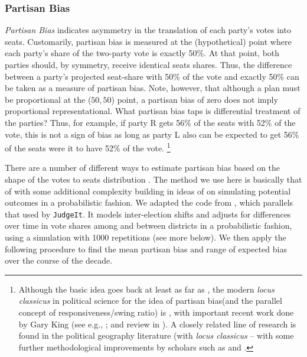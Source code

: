             \subsubsection*{Partisan Bias}
%
    \textit{Partisan Bias} indicates asymmetry in the translation of each party’s votes into seats. Customarily, partisan bias is measured at the (hypothetical) point where each party’s share of the two-party vote is exactly 50\%. At that point, both parties should, by symmetry, receive identical seats shares. Thus, the difference between a party’s projected seat-share with 50\% of the vote and exactly 50\% can be taken as a measure of partisan bias. Note, however, that although a plan must be proportional at the ($50,50$) point, a partisan bias of zero does not imply proportional representational. What partisan bias taps is differential treatment of the parties? Thus, for example, if party R gets 56\% of the seats with 52\% of the vote, this is not a sign of bias as long as party L also can be expected to get 56\% of the seats were it to have 52\% of the vote.
        \footnote{Although the basic idea goes back at least as far as \citet{Dahl1956}, the modern \textit{locus classicus} in political science for the idea of partisan bias(and the parallel concept of responsiveness/swing ratio) is \citet{Tufte1973}, with important recent work done by Gary King (see e.g., \citep{GelmanKing1994_unifiedAJPS}; and review in \citet{GrofmanKing2007_ELJ}). A closely related line of research is found in the political geography literature (with \textit{locus classicus} \citet{Brookes1959, Brookes1960} -- with some further methodological improvements by scholars such as \citet{Johnston1994, Rossiter1997} and \citet{Johnston2002}.}   
\par
    There are a number of different ways to estimate partisan bias based on the shape of the votes to seats distribution \citep{Tufte1973, Grofman1983, Browning_King_1987_seats_votes, GelmanKing1994_unifiedAJPS, Grofman_et_al_1997_SwingRatio_Bias, Zingher2016_bias_swingratio_JEPP}. The method we use here is basically that of \citet{Tufte1973} with some additional complexity building in ideas of \citet{GelmanKing1994_unifiedAJPS} on simulating potential outcomes in a probabilistic fashion. We adapted the code from \citet{Kastellec_et_al_2008_PS}, which parallels that used by \texttt{JudgeIt}. It models inter-election shifts and adjusts for differences over time in vote shares among and between districts in a probabilistic fashion, using a simulation with 1000 repetitions (see more below). We then apply the following procedure to find the mean partisan bias and range of expected bias over the course of the decade.
